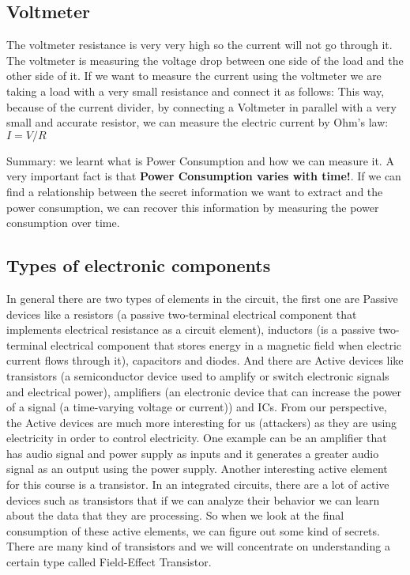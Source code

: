 \subsection{Voltmeter}
The voltmeter resistance is very very high so the current will not go through it. The voltmeter is measuring the voltage drop between one side of the load and the other side of it. If we want to measure the current using the voltmeter we are taking a load with a very small resistance and connect it as follows:
This way, because of the current divider, by connecting a Voltmeter in parallel with a very small and accurate resistor, we can measure the electric current by Ohm's law: $I=V/R$
 
Summary: we learnt what is Power Consumption and how we can measure it.
A very important fact is that \textbf{Power Consumption varies with time!}.
If we can find a relationship between the secret information we want to extract and the power consumption, we can recover this information by measuring the power consumption over time. 

\subsection{Types of electronic components}
In general there are two types of elements in the circuit, the first one are Passive devices like a resistors (a passive two-terminal electrical component that implements electrical resistance as a circuit element), inductors (is a passive two-terminal electrical component that stores energy in a magnetic field when electric current flows through it), capacitors and diodes. And there are Active devices like transistors (a semiconductor device used to amplify or switch electronic signals and electrical power), amplifiers (an electronic device that can increase the power of a signal (a time-varying voltage or current)) and ICs. From our perspective, the Active devices are much more interesting for us (attackers) as they are using electricity in order to control electricity. One example can be an amplifier that has audio signal and power supply as inputs and it generates a greater audio signal as an output using the power supply. 
Another interesting active element for this course is a transistor. In an integrated circuits, there are a lot of active devices such as transistors  that if we can analyze their behavior we can learn about the data that they are processing. So when we look at the final consumption of these active elements, we can figure out some kind of secrets.
There are many kind of transistors and we will concentrate on understanding a certain type called Field-Effect Transistor.

